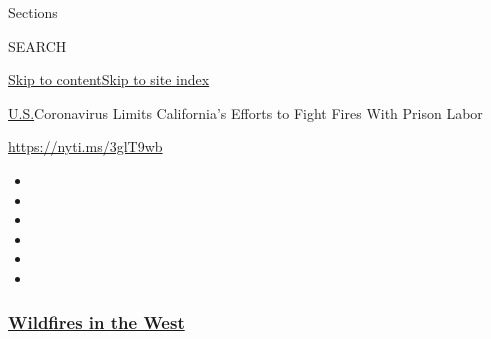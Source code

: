 Sections

SEARCH

\protect\hyperlink{site-content}{Skip to
content}\protect\hyperlink{site-index}{Skip to site index}

\href{/section/us}{U.S.}\textbar{}Coronavirus Limits California's
Efforts to Fight Fires With Prison Labor

\url{https://nyti.ms/3glT9wb}

\begin{itemize}
\item
\item
\item
\item
\item
\item
\end{itemize}

\hypertarget{wildfires-in-the-west}{%
\subsubsection{\texorpdfstring{\href{https://www.nytimes3xbfgragh.onion/spotlight/california-wildfires?name=styln-california-wildfires\&region=TOP_BANNER\&block=storyline_menu_recirc\&action=click\&pgtype=Article\&impression_id=bf7937e0-f52c-11ea-84f0-cdc2bcc2aabe\&variant=undefined}{Wildfires
in the West}}{Wildfires in the West}}\label{wildfires-in-the-west}}

